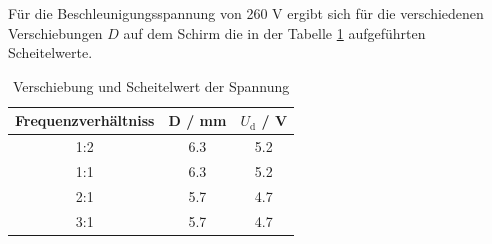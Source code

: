 Für die Beschleunigungsspannung von 260 V ergibt sich für die verschiedenen Verschiebungen $D$ auf dem Schirm die in der Tabelle \ref{tab:scheitel} aufgeführten Scheitelwerte.
\begin{table}
  \centering
  \begin{tabular}{c c c}
    \toprule
	Frequenzverhältniss & D / mm & $U_\text{d}$ / V \\
    \midrule
	1:2	& 6.3 & 5.2 	\\
	1:1	& 6.3 & 5.2	\\
	2:1	& 5.7 & 4.7	\\
	3:1	& 5.7 & 4.7	\\
    \bottomrule
  \end{tabular}
  \caption{Verschiebung und Scheitelwert der Spannung}
  \label{tab:scheitel}
\end{table}
